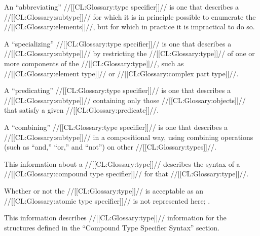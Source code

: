 
An ``abbreviating'' //[[CL:Glossary:type specifier]]// is one that describes a //[[CL:Glossary:subtype]]// for which it is in principle possible to enumerate the //[[CL:Glossary:elements]]//, but for which in practice it is impractical to do so.

A ``specializing'' //[[CL:Glossary:type specifier]]// is one that describes a //[[CL:Glossary:subtype]]// by restricting the //[[CL:Glossary:type]]// of one or more components of the //[[CL:Glossary:type]]//, such as //[[CL:Glossary:element type]]// or //[[CL:Glossary:complex part type]]//.

A ``predicating'' //[[CL:Glossary:type specifier]]// is one that describes a //[[CL:Glossary:subtype]]// containing only those //[[CL:Glossary:objects]]// that satisfy a given //[[CL:Glossary:predicate]]//.

A ``combining'' //[[CL:Glossary:type specifier]]// is one that describes a //[[CL:Glossary:subtype]]// in a compositional way, using combining operations (such as ``and,'' ``or,'' and ``not'') on other //[[CL:Glossary:types]]//.

\endsubsubsubsection%


This information about a //[[CL:Glossary:type]]// describes the syntax of a  //[[CL:Glossary:compound type specifier]]// for that //[[CL:Glossary:type]]//.

Whether or not the //[[CL:Glossary:type]]// is acceptable as an //[[CL:Glossary:atomic type specifier]]// is not represented here; \seesection\TypeSpecEntries.

\endsubsubsubsection%


This information describes //[[CL:Glossary:type]]// information for the structures defined in the ``Compound Type Specifier Syntax'' section.

\endsubsubsubsection%


